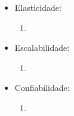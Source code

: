 \documentclass[11pt,a4paper]{article}
\begin{document}
\begin{itemize}
\begin{enumerate}
		\item 
	\end{enumerate}
	\item Elasticidade:
	\begin{enumerate}
		\item 
	\end{enumerate}
	\item Escalabilidade:
	\begin{enumerate}
		\item 
	\end{enumerate}
	\item Confiabilidade:
	\begin{enumerate}
		\item 
	\end{enumerate}
\end{itemize}
\end{document}
